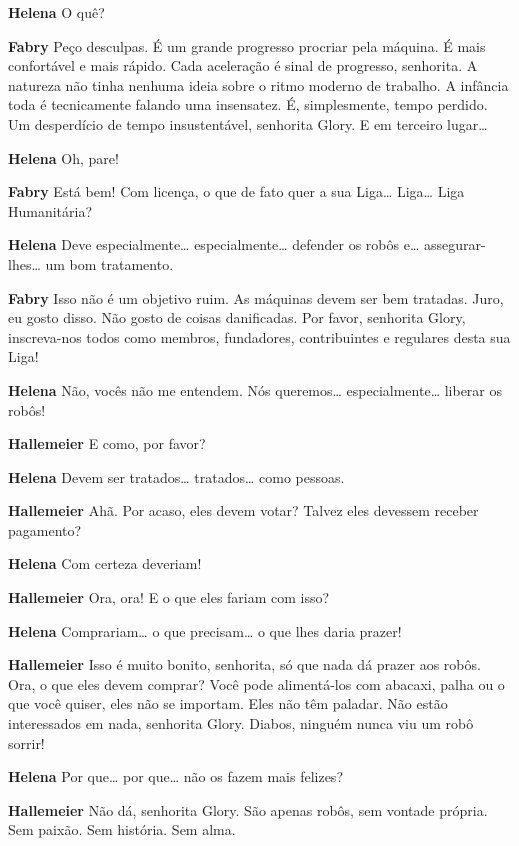 \textbf{Helena} O quê?

\textbf{Fabry} Peço desculpas. É um grande progresso procriar pela máquina. É mais
confortável e mais rápido. Cada aceleração é sinal de progresso, senhorita. A
natureza não tinha nenhuma ideia sobre o ritmo moderno de trabalho. A infância
toda é tecnicamente falando uma insensatez. É, simplesmente, tempo perdido. Um
desperdício de tempo insustentável, senhorita Glory. E em terceiro lugar\ldots{}

\textbf{Helena} Oh, pare!

\textbf{Fabry} Está bem! Com licença, o que de fato quer a sua Liga\ldots{} Liga\ldots{} Liga
Humanitária?

\textbf{Helena} Deve especialmente\ldots{} especialmente\ldots{} defender os robôs e\ldots{}
assegurar-lhes\ldots{} um bom tratamento.

\textbf{Fabry} Isso não é um objetivo ruim. As máquinas devem ser bem tratadas. Juro,
eu gosto disso. Não gosto de coisas danificadas. Por favor, senhorita Glory,
inscreva-nos todos como membros, fundadores, contribuintes e regulares desta sua
Liga!

\textbf{Helena} Não, vocês não me entendem. Nós queremos\ldots{} especialmente\ldots{} liberar os
robôs!

\textbf{Hallemeier} E como, por favor?

\textbf{Helena} Devem ser tratados\ldots{} tratados\ldots{} como pessoas.

\textbf{Hallemeier} Ahã. Por acaso, eles devem votar? Talvez eles devessem receber
pagamento?

\textbf{Helena} Com certeza deveriam!

\textbf{Hallemeier} Ora, ora! E o que eles fariam com isso?

\textbf{Helena} Comprariam\ldots{} o que precisam\ldots{} o que lhes daria prazer!

\textbf{Hallemeier} Isso é muito bonito, senhorita, só que nada dá prazer aos robôs.
Ora, o que eles devem comprar? Você pode alimentá-los com abacaxi, palha
ou o que você quiser, eles não se importam. Eles não têm paladar. Não estão
interessados em nada, senhorita Glory. Diabos, ninguém nunca viu um robô sorrir!

\textbf{Helena} Por que\ldots{} por que\ldots{} não os fazem mais felizes?

\textbf{Hallemeier} Não dá, senhorita Glory. São apenas robôs, sem vontade própria.
Sem paixão. Sem história. Sem alma.


